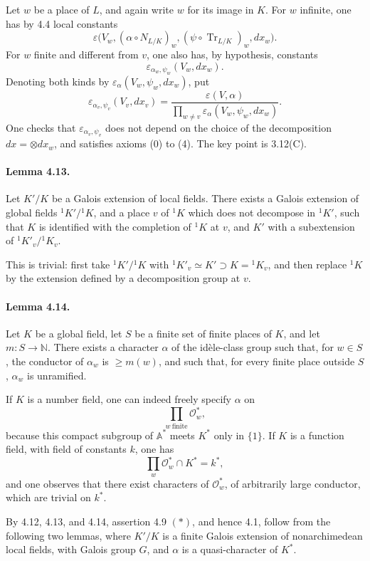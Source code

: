 \documentclass[10pt]{article}
\newcommand{\Tr}{\operatorname{Tr}}
\providecommand{\Tr}{\operatorname{Tr}}
\providecommand{\Tr}{\operatorname{Tr}}
\providecommand{\Tr}{\operatorname{Tr}}
\begin{document}
Let \(w\) be a place of \(L\), and again write \(w\) for its image in \(K\). For \(w\) infinite, one has by 4.4 local constants
\[
\varepsilon\bigl(V_w,(\alpha\circ N_{L/K})_w,
(\psi\circ\Tr_{L/K})_w,dx_w\bigr).
\]
For \(w\) finite and different from \(v\), one also has, by hypothesis, constants
\[
\varepsilon_{\alpha_w,\psi_w}(V_w,dx_w).
\]
Denoting both kinds by \(\varepsilon_\alpha(V_w,\psi_w,dx_w)\), put
\[
\varepsilon_{\alpha_v,\psi_v}(V_v,dx_v)
=
\frac{\varepsilon(V,\alpha)}
{\displaystyle\prod_{w\ne v}\varepsilon_\alpha(V_w,\psi_w,dx_w)}.
\]
One checks that \(\varepsilon_{\alpha_v,\psi_v}\) does not depend on the choice of the decomposition \(dx=\otimes dx_w\), and satisfies axioms (0) to (4). The key point is 3.12(C).

\paragraph{Lemma 4.13.} Let \(K'/K\) be a Galois extension of local fields. There exists a Galois extension of global fields \(^{1}K'/{}^{1}K\), and a place \(v\) of \(^{1}K\) which does not decompose in \(^{1}K'\), such that \(K\) is identified with the completion of \(^{1}K\) at \(v\), and \(K'\) with a subextension of \(^{1}K'_v/{}^{1}K_v\).

This is trivial: first take \(^{1}K'/{}^{1}K\) with \(^{1}K'_v\simeq K'\supset K={}^{1}K_v\), and then replace \(^{1}K\) by the extension defined by a decomposition group at \(v\).

\paragraph{Lemma 4.14.} Let \(K\) be a global field, let \(S\) be a finite set of finite places of \(K\), and let \(m:S\to\mathbb N\). There exists a character \(\alpha\) of the idèle-class group such that, for \(w\in S\), the conductor of \(\alpha_w\) is \(\ge m(w)\), and such that, for every finite place outside \(S\), \(\alpha_w\) is unramified.

If \(K\) is a number field, one can indeed freely specify \(\alpha\) on
\[
\prod_{w\ \mathrm{finite}}\mathcal O_w^*,
\]
because this compact subgroup of \(\mathbb A^*\) meets \(K^*\) only in \(\{1\}\). If \(K\) is a function field, with field of constants \(k\), one has
\[
\prod_w\mathcal O_w^*\cap K^*=k^*,
\]
and one observes that there exist characters of \(\mathcal O_w^*\), of arbitrarily large conductor, which are trivial on \(k^*\).

By 4.12, 4.13, and 4.14, assertion 4.9 \((*)\), and hence 4.1, follow from the following two lemmas, where \(K'/K\) is a finite Galois extension of nonarchimedean local fields, with Galois group \(G\), and \(\alpha\) is a quasi-character of \(K^*\).
\end{document}

